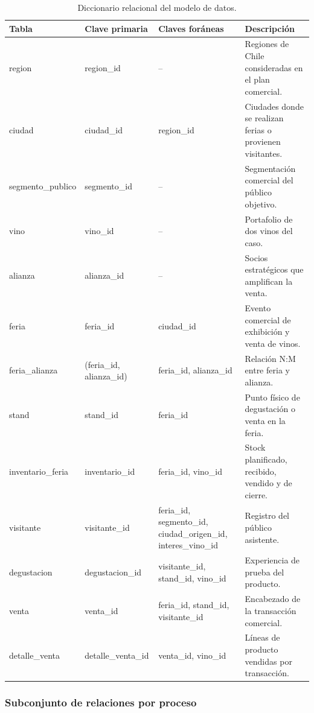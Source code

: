 \documentclass[10pt,a4paper]{article}
\begin{document}
\begin{table}[H]
\centering
\caption{Diccionario relacional del modelo de datos.}
\label{tab:diccionario}
\footnotesize
\begin{tabular}{p{2.2cm} p{2.2cm} p{3.5cm} p{5.5cm}}
\toprule
\textbf{Tabla} & \textbf{Clave primaria} & \textbf{Claves for\'aneas} & \textbf{Descripci\'on} \\
\midrule
region & region\_id & -- & Regiones de Chile consideradas en el plan comercial. \\
ciudad & ciudad\_id & region\_id & Ciudades donde se realizan ferias o provienen visitantes. \\
segmento\_publico & segmento\_id & -- & Segmentaci\'on comercial del p\'ublico objetivo. \\
vino & vino\_id & -- & Portafolio de dos vinos del caso. \\
alianza & alianza\_id & -- & Socios estrat\'egicos que amplifican la venta. \\
feria & feria\_id & ciudad\_id & Evento comercial de exhibici\'on y venta de vinos. \\
feria\_alianza & (feria\_id, alianza\_id) & feria\_id, alianza\_id & Relaci\'on N:M entre feria y alianza. \\
stand & stand\_id & feria\_id & Punto f\'isico de degustaci\'on o venta en la feria. \\
inventario\_feria & inventario\_id & feria\_id, vino\_id & Stock planificado, recibido, vendido y de cierre. \\
visitante & visitante\_id & feria\_id, segmento\_id, ciudad\_origen\_id, interes\_vino\_id & Registro del p\'ublico asistente. \\
degustacion & degustacion\_id & visitante\_id, stand\_id, vino\_id & Experiencia de prueba del producto. \\
venta & venta\_id & feria\_id, stand\_id, visitante\_id & Encabezado de la transacci\'on comercial. \\
detalle\_venta & detalle\_venta\_id & venta\_id, vino\_id & L\'ineas de producto vendidas por transacci\'on. \\
\bottomrule
\end{tabular}
\end{table}

\subsubsection{Subconjunto de relaciones por proceso}
\end{document}
